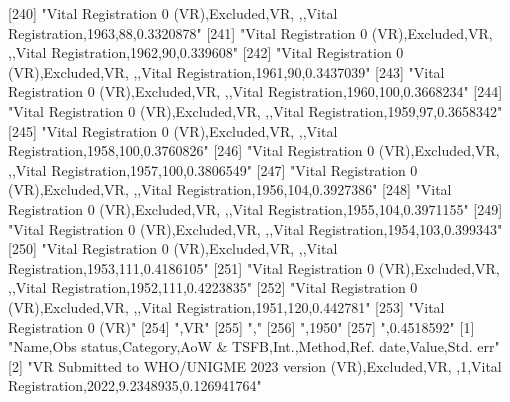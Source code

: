 [240] "Vital Registration 0 (VR),Excluded,VR, ,,Vital Registration,1963,88,0.3320878"                                                
[241] "Vital Registration 0 (VR),Excluded,VR, ,,Vital Registration,1962,90,0.339608"                                                 
[242] "Vital Registration 0 (VR),Excluded,VR, ,,Vital Registration,1961,90,0.3437039"                                                
[243] "Vital Registration 0 (VR),Excluded,VR, ,,Vital Registration,1960,100,0.3668234"                                               
[244] "Vital Registration 0 (VR),Excluded,VR, ,,Vital Registration,1959,97,0.3658342"                                                
[245] "Vital Registration 0 (VR),Excluded,VR, ,,Vital Registration,1958,100,0.3760826"                                               
[246] "Vital Registration 0 (VR),Excluded,VR, ,,Vital Registration,1957,100,0.3806549"                                               
[247] "Vital Registration 0 (VR),Excluded,VR, ,,Vital Registration,1956,104,0.3927386"                                               
[248] "Vital Registration 0 (VR),Excluded,VR, ,,Vital Registration,1955,104,0.3971155"                                               
[249] "Vital Registration 0 (VR),Excluded,VR, ,,Vital Registration,1954,103,0.399343"                                                
[250] "Vital Registration 0 (VR),Excluded,VR, ,,Vital Registration,1953,111,0.4186105"                                               
[251] "Vital Registration 0 (VR),Excluded,VR, ,,Vital Registration,1952,111,0.4223835"                                               
[252] "Vital Registration 0 (VR),Excluded,VR, ,,Vital Registration,1951,120,0.442781"                                                
[253] "Vital Registration 0 (VR)"                                                                                                    
[254] ",VR"                                                                                                                          
[255] ","                                                                                                                            
[256] ",1950"                                                                                                                        
[257] ",0.4518592"                                                                                                                   
  [1] "Name,Obs status,Category,AoW & TSFB,Int.,Method,Ref. date,Value,Std. err"                                                     
  [2] "VR Submitted to WHO/UNIGME 2023 version (VR),Excluded,VR, ,1,Vital Registration,2022,9.2348935,0.126941764"                   
